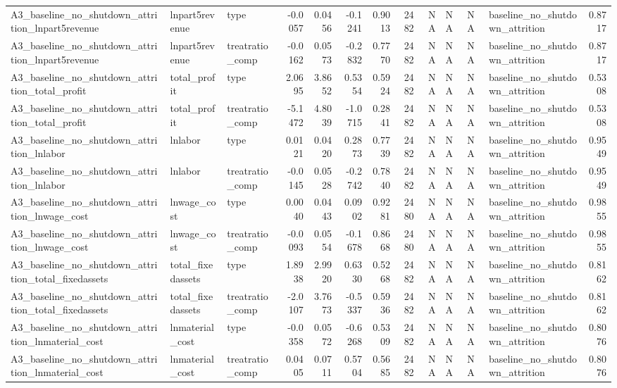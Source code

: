 \begin{table}
\begin{tabular}[t]{lllrrrrrrlllr}
A3\_baseline\_no\_shutdown\_attrition\_lnpart5revenue & lnpart5revenue & type & -0.0057 & 0.0456 & -0.1241 & 0.9013 & 2482 & NA & NA & NA & baseline\_no\_shutdown\_attrition & 0.8717\\
A3\_baseline\_no\_shutdown\_attrition\_lnpart5revenue & lnpart5revenue & treatratio\_comp & -0.0162 & 0.0573 & -0.2832 & 0.7770 & 2482 & NA & NA & NA & baseline\_no\_shutdown\_attrition & 0.8717\\
A3\_baseline\_no\_shutdown\_attrition\_total\_profit & total\_profit & type & 2.0695 & 3.8652 & 0.5354 & 0.5924 & 2482 & NA & NA & NA & baseline\_no\_shutdown\_attrition & 0.5308\\
\addlinespace
A3\_baseline\_no\_shutdown\_attrition\_total\_profit & total\_profit & treatratio\_comp & -5.1472 & 4.8039 & -1.0715 & 0.2841 & 2482 & NA & NA & NA & baseline\_no\_shutdown\_attrition & 0.5308\\
A3\_baseline\_no\_shutdown\_attrition\_lnlabor & lnlabor & type & 0.0121 & 0.0420 & 0.2873 & 0.7739 & 2482 & NA & NA & NA & baseline\_no\_shutdown\_attrition & 0.9549\\
A3\_baseline\_no\_shutdown\_attrition\_lnlabor & lnlabor & treatratio\_comp & -0.0145 & 0.0528 & -0.2742 & 0.7840 & 2482 & NA & NA & NA & baseline\_no\_shutdown\_attrition & 0.9549\\
A3\_baseline\_no\_shutdown\_attrition\_lnwage\_cost & lnwage\_cost & type & 0.0040 & 0.0443 & 0.0902 & 0.9281 & 2480 & NA & NA & NA & baseline\_no\_shutdown\_attrition & 0.9855\\
A3\_baseline\_no\_shutdown\_attrition\_lnwage\_cost & lnwage\_cost & treatratio\_comp & -0.0093 & 0.0554 & -0.1678 & 0.8668 & 2480 & NA & NA & NA & baseline\_no\_shutdown\_attrition & 0.9855\\
\addlinespace
A3\_baseline\_no\_shutdown\_attrition\_total\_fixedassets & total\_fixedassets & type & 1.8938 & 2.9920 & 0.6330 & 0.5268 & 2482 & NA & NA & NA & baseline\_no\_shutdown\_attrition & 0.8162\\
A3\_baseline\_no\_shutdown\_attrition\_total\_fixedassets & total\_fixedassets & treatratio\_comp & -2.0107 & 3.7673 & -0.5337 & 0.5936 & 2482 & NA & NA & NA & baseline\_no\_shutdown\_attrition & 0.8162\\
A3\_baseline\_no\_shutdown\_attrition\_lnmaterial\_cost & lnmaterial\_cost & type & -0.0358 & 0.0572 & -0.6268 & 0.5309 & 2482 & NA & NA & NA & baseline\_no\_shutdown\_attrition & 0.8076\\
A3\_baseline\_no\_shutdown\_attrition\_lnmaterial\_cost & lnmaterial\_cost & treatratio\_comp & 0.0405 & 0.0711 & 0.5704 & 0.5685 & 2482 & NA & NA & NA & baseline\_no\_shutdown\_attrition & 0.8076\\

\end{tabular}
\end{table}
